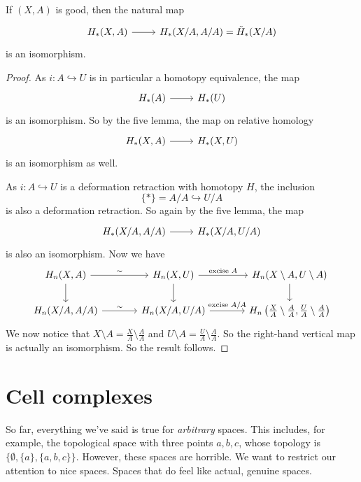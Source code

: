 \documentclass[a4paper]{article}
\begin{document}
\begin{thm}
  If $(X, A)$ is good, then the natural map
  \[
    \begin{tikzcd}
      H_*(X, A) \ar[r] & H_*(X/A, A/A) = \tilde{H}_*(X/A)
    \end{tikzcd}
  \]
  is an isomorphism.
\end{thm}

\begin{proof}
  As $i: A \hookrightarrow U$ is in particular a homotopy equivalence, the map
  \[
    \begin{tikzcd}
      H_*(A) \ar[r] & H_*(U)
    \end{tikzcd}
  \]
  is an isomorphism. So by the five lemma, the map on relative homology
  \[
    \begin{tikzcd}
      H_*(X, A) \ar[r] & H_*(X, U)
    \end{tikzcd}
  \]
  is an isomorphism as well.

  As $i: A \hookrightarrow U$ is a deformation retraction with homotopy $H$, the inclusion
  \[
    \{*\} = A/A \hookrightarrow U/A
  \]
  is also a deformation retraction. So again by the five lemma, the map
  \[
    \begin{tikzcd}
      H_*(X/A, A/A) \ar[r] & H_*(X/A, U/A)
    \end{tikzcd}
  \]
  is also an isomorphism. Now we have
  \[
    \begin{tikzcd}[column sep=large]
      H_n(X, A) \ar[d] \ar[r, "\sim"] & H_n(X, U) \ar[d] \ar[r, "\text{excise }A"] & H_n(X \setminus A, U \setminus A)\ar[d]\\
      H_n(X/A, A/A) \ar[r, "\sim"] & H_n(X/A, U/A) \ar[r, "\text{excise }A/A"] & H_n\left(\frac{X}{A}\setminus\frac{A}{A}, \frac{U}{A}\setminus\frac{A}{A}\right)
    \end{tikzcd}
  \]
  We now notice that $X\setminus A = \frac{X}{A} \setminus \frac{A}{A}$ and $U \setminus A = \frac{U}{A}\setminus \frac{A}{A}$. So the right-hand vertical map is actually an isomorphism. So the result follows.
\end{proof}


\section{Cell complexes}

So far, everything we've said is true for \emph{arbitrary} spaces. This includes, for example, the topological space with three points $a, b, c$, whose topology is $\{\emptyset, \{a\}, \{a, b, c\}\}$. However, these spaces are horrible. We want to restrict our attention to nice spaces. Spaces that do feel like actual, genuine spaces.
\end{document}
